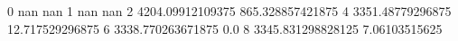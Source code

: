 0 nan nan
1 nan nan
2 4204.09912109375 865.328857421875
4 3351.48779296875 12.717529296875
6 3338.770263671875 0.0
8 3345.831298828125 7.06103515625
